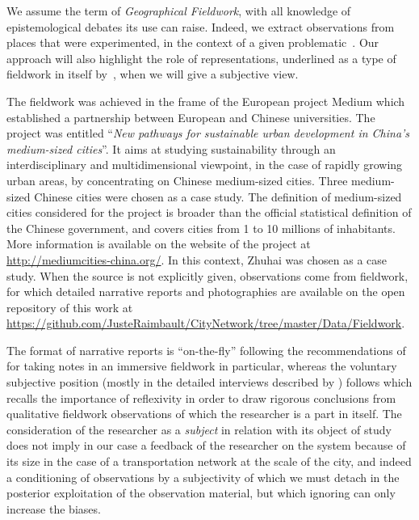We assume the term of \emph{Geographical Fieldwork}, with all knowledge of epistemological debates its use can raise. Indeed, we extract observations from places that were experimented, in the context of a given problematic~\citep{retaille2010terrain}. Our approach will also highlight the role of representations, underlined as a type of fieldwork in itself by~\cite{lefort2012terrain}, when we will give a subjective view.

The fieldwork was achieved in the frame of the European project Medium which established a partnership between European and Chinese universities. The project was entitled ``\textit{New pathways for sustainable urban development in China’s medium-sized cities}''. It aims at studying sustainability through an interdisciplinary and multidimensional viewpoint, in the case of rapidly growing urban areas, by concentrating on Chinese medium-sized cities. Three medium-sized Chinese cities were chosen as a case study. The definition of medium-sized cities considered for the project is broader than the official statistical definition of the Chinese government, and covers cities from 1 to 10 millions of inhabitants. More information is available on the website of the project at \url{http://mediumcities-china.org/}. In this context, Zhuhai was chosen as a case study. When the source is not explicitly given, observations come from fieldwork, for which detailed narrative reports and photographies are available on the open repository of this work at \url{https://github.com/JusteRaimbault/CityNetwork/tree/master/Data/Fieldwork}.

The format of narrative reports is ``on-the-fly'' following the recommendations of \cite{goffman1989fieldwork} for taking notes in an immersive fieldwork in particular, whereas the voluntary subjective position (mostly in the detailed interviews described by \cite{raimbault2018caracterisation}) follows \cite{ball1990self} which recalls the importance of reflexivity in order to draw rigorous conclusions from qualitative fieldwork observations of which the researcher is a part in itself. The consideration of the researcher as a \emph{subject} in relation with its object of study does not imply in our case a feedback of the researcher on the system because of its size in the case of a transportation network at the scale of the city, and indeed a conditioning of observations by a subjectivity of which we must detach in the posterior exploitation of the observation material, but which ignoring can only increase the biases.


